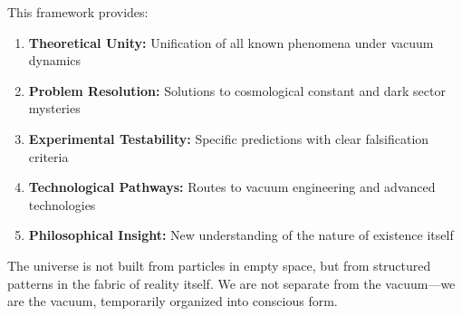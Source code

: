 \documentclass[12pt,a4paper]{article}
\begin{document}
This framework provides:
\begin{enumerate}
\item \textbf{Theoretical Unity:} Unification of all known phenomena under vacuum dynamics
\item \textbf{Problem Resolution:} Solutions to cosmological constant and dark sector mysteries
\item \textbf{Experimental Testability:} Specific predictions with clear falsification criteria
\item \textbf{Technological Pathways:} Routes to vacuum engineering and advanced technologies
\item \textbf{Philosophical Insight:} New understanding of the nature of existence itself
\end{enumerate}

The universe is not built from particles in empty space, but from structured patterns in the fabric of reality itself. We are not separate from the vacuum—we are the vacuum, temporarily organized into conscious form.
\end{document}

